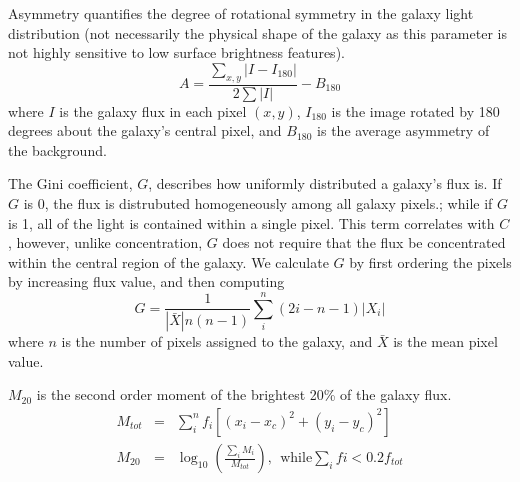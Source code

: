 \documentclass[twocolumn]{aastex6}
\newcommand{\M}[1]{$M_{#1}$}
\begin{document}
Asymmetry quantifies the degree of rotational symmetry in the galaxy light distribution (not necessarily the physical shape of the galaxy as this parameter is not highly sensitive to low surface brightness features).  
\begin{equation}
A = \frac{\sum_{x,y} |I - I_{180}|}{ 2\sum|I|} - B_{180}
\end{equation}
where $I$ is the galaxy flux in each pixel $(x, y)$, $I_{180}$ is the image rotated by 180 degrees about the galaxy's central pixel, and $B_{180}$ is the average asymmetry of the background. 

The Gini coefficient, $G$, describes how uniformly distributed a galaxy's flux is.  If $G$ is 0, the flux is distrubuted homogeneously among all galaxy pixels.; while if $G$ is 1,  all of the light is contained within a single pixel. This term correlates with $C$, however, unlike concentration, $G$ does not require that the flux be concentrated within the central region of the galaxy.  We calculate $G$ by first ordering the pixels by increasing flux value, and then computing
\begin{equation}
G = \frac{1}{|\bar X|n(n-1)}\sum_i^n(2i-n-1)|X_i|
\end{equation}
where $n$ is the number of pixels assigned to the galaxy, and $\bar X$ is the mean pixel value. 

\M{20} is the second order moment of the brightest 20\% of the galaxy flux. 
\begin{eqnarray}
 M_{tot} & = & \sum_i^nf_i[(x_i-x_c)^2 + (y_i-y_c)^2]  \\
 M_{20} & = & \log_{10} (\frac{\sum_iM_i}{M_{tot}}), ~~\textrm{while} \sum_ifi < 0.2f_{tot}
\end{eqnarray}



\end{document}
